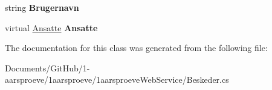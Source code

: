 \begin{DoxyCompactItemize}
\item 
\hypertarget{class__1aarsproeve_web_service_1_1_beskeder_a8e9e54630b3514f3ed5c89ce153df96c}{}string {\bfseries Brugernavn}\label{class__1aarsproeve_web_service_1_1_beskeder_a8e9e54630b3514f3ed5c89ce153df96c}

\item 
\hypertarget{class__1aarsproeve_web_service_1_1_beskeder_aa8074ce4b250925fe0635463000cacbd}{}virtual \hyperlink{class__1aarsproeve_web_service_1_1_ansatte}{Ansatte} {\bfseries Ansatte}\label{class__1aarsproeve_web_service_1_1_beskeder_aa8074ce4b250925fe0635463000cacbd}

\end{DoxyCompactItemize}


The documentation for this class was generated from the following file\+:\begin{DoxyCompactItemize}
\item 
Documents/\+Git\+Hub/1-\/aarsproeve/1aarsproeve/1aarsproeve\+Web\+Service/Beskeder.\+cs\end{DoxyCompactItemize}

